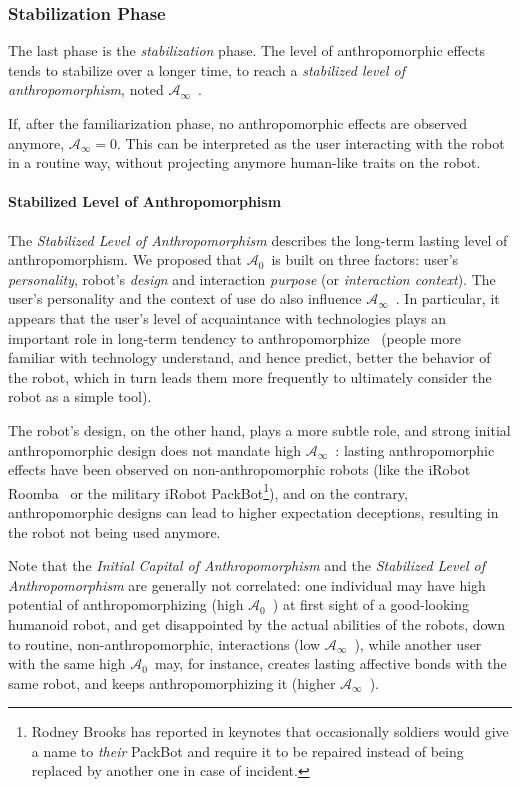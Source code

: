 \documentclass{frontiersSCNS} %
\newcommand{\ICA}{{$\mathcal{A}_0$~}}
\newcommand{\SLA}{{$\mathcal{A}_\infty$~}}
\newcommand{\sla}{{\mathcal{A}_\infty}}
\begin{document}
\subsubsection{Stabilization Phase\\}
\label{sec:stabilization}

The last phase is the \emph{stabilization} phase. The level of anthropomorphic
effects tends to stabilize over a longer time, to reach a \emph{stabilized
level of anthropomorphism}, noted \SLA.

If, after the familiarization phase, no anthropomorphic effects are observed
anymore, $\sla = 0$. This can be interpreted as the user interacting with the
robot in a routine way, without projecting anymore human-like traits on the
robot.


\paragraph{Stabilized Level of Anthropomorphism\\}

The \emph{Stabilized Level of Anthropomorphism} describes the long-term lasting
level of anthropomorphism.  We proposed that \ICA is built on three factors:
user's \emph{personality}, robot's \emph{design} and interaction \emph{purpose}
(or \emph{interaction context}). The user's personality and the context of use
do also influence \SLA.  In particular, it appears that the user's level of
acquaintance with technologies plays an important role in long-term tendency to
anthropomorphize~\citep{fink_living_2013} (people more familiar with technology
understand, and hence predict, better the behavior of the robot, which in turn
leads them more frequently to ultimately consider the robot as a simple tool).

The robot's design, on the other hand, plays a more subtle role, and strong
initial anthropomorphic design does not mandate high \SLA: lasting
anthropomorphic effects have been observed on non-anthropomorphic robots (like
the iRobot Roomba~\citep{fink_living_2013} or the military iRobot
PackBot\footnote{Rodney Brooks has reported in keynotes that occasionally
soldiers would give a name to \emph{their} PackBot and require it to be repaired
instead of being replaced by another one in case of incident.}), and on the
contrary, anthropomorphic designs can lead to higher expectation deceptions,
resulting in the robot not being used anymore.

Note that the \emph{Initial Capital of Anthropomorphism} and the
\emph{Stabilized Level of Anthropomorphism} are generally not correlated: one
individual may have high potential of anthropomorphizing (high \ICA) at first
sight of a good-looking humanoid robot, and get disappointed by the actual
abilities of the robots, down to routine, non-anthropomorphic, interactions (low
\SLA), while another user with the same high \ICA may, for instance, creates
lasting affective bonds with the same robot, and keeps anthropomorphizing it
(higher \SLA).
\end{document}
